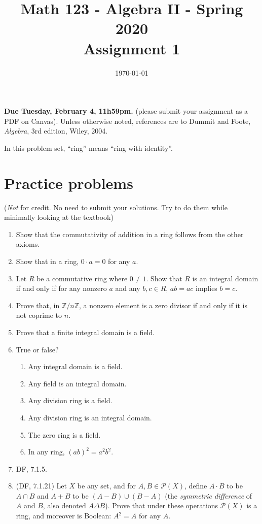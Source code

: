 \documentclass{amsart}
\title[Math 123, Spring 2020: assignment 1]{Math 123 - Algebra II - Spring 2020 \\ Assignment 1}
\date{\today}
\theoremstyle{definition}
\newcommand{\Ps}{\mathcal{P}}
\newcommand{\Zz}{\mathbb{Z}}
\begin{document}

\vspace*{-10em}
\maketitle

\textbf{Due Tuesday, February 4, 11h59pm.} (please submit your assignment as a PDF on Canvas). Unless otherwise noted, references are to Dummit and Foote, \emph{Algebra}, 3rd edition, Wiley, 2004.

In this problem set, ``ring'' means ``ring with identity''.

\section*{Practice problems} (\emph{Not} for credit. No need to submit your solutions. Try to do them while minimally looking at the textbook)

\begin{enumerate}
\item Show that the commutativity of addition in a ring follows from the other axioms.
\item Show that in a ring, $0 \cdot a = 0$ for any $a$.
\item Let $R$ be a commutative ring where $0 \neq 1$. Show that $R$ is an integral domain if and only if for any nonzero $a$ and any $b,c \in R$, $ab = ac$ implies $b = c$.
\item Prove that, in $\Zz / n \Zz$, a nonzero element is a zero divisor if and only if it is not coprime to $n$. 
\item Prove that a finite integral domain is a field.
\item True or false?
  \begin{enumerate}
  \item Any integral domain is a field.
  \item Any field is an integral domain.
  \item Any division ring is a field.
  \item Any division ring is an integral domain.
  \item The zero ring is a field.
  \item In any ring, $(ab)^2 = a^2 b^2$.
  \end{enumerate}
\item DF, 7.1.5.
\item (DF, 7.1.21) Let $X$ be any set, and for $A, B \in \Ps (X)$, define $A \cdot B$ to be $A \cap B$ and $A + B$ to be $(A - B) \cup (B - A)$ (the \emph{symmetric difference} of $A$ and $B$, also denoted $A \Delta B$). Prove that under these operations $\Ps (X)$ is a ring, and moreover is Boolean: $A^2 = A$ for any $A$.   
\end{enumerate}
\end{document}
